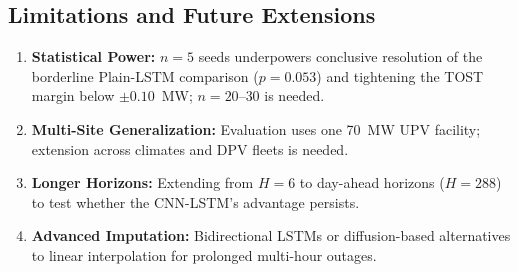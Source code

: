 \documentclass[conference]{IEEEtran}
\begin{document}
\subsection*{Limitations and Future Extensions}
\begin{enumerate}
    \item \textbf{Statistical Power:} $n=5$ seeds underpowers conclusive resolution of the borderline Plain-LSTM comparison ($p=0.053$) and tightening the TOST margin below $\pm0.10$~MW; $n=20$--$30$ is needed.
    \item \textbf{Multi-Site Generalization:} Evaluation uses one 70~MW UPV facility; extension across climates and DPV fleets is needed.
    \item \textbf{Longer Horizons:} Extending from $H=6$ to day-ahead horizons ($H=288$) to test whether the CNN-LSTM's advantage persists.
    \item \textbf{Advanced Imputation:} Bidirectional LSTMs or diffusion-based alternatives to linear interpolation for prolonged multi-hour outages.
\end{enumerate}
\end{document}
